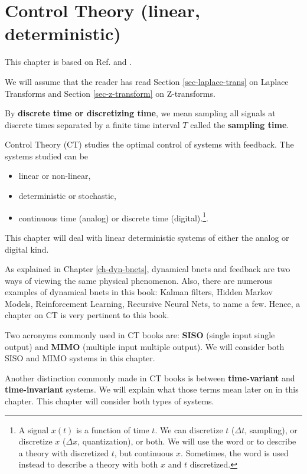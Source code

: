 \chapter{Control Theory (linear, deterministic)}
\label{ch-control-th}

This chapter is
based on Ref.\cite{wikibooks-control-systems}
and \cite{wiki-signal-flow}.

We will assume that
the reader has read Section \ref{sec-laplace-trans}
on Laplace Transforms
and Section \ref{sec-z-transform}
on Z-transforms.

By {\bf discrete time or discretizing time}, we mean 
 sampling all signals
 at discrete times
 separated by a finite time
 interval $T$
 called the {\bf sampling time}.

Control Theory (CT)
studies the optimal
control of systems
with feedback. 
The systems studied can
be 
\begin{itemize}
\item linear or non-linear,
\item deterministic or stochastic,
\item continuous time (analog)
or
discrete time (digital).\footnote{A signal $x(t)$ is a function of time $t$.
We can discretize $t$ ($\Delta t$, sampling), or discretize 
$x$ ($\Delta x$, quantization),
or both. We will use the word
 or  to
describe a theory with discretized $t$,
but continuous $x$. 
Sometimes,
the word 
is used instead to describe
a theory with both $x$ and $t$ discretized.}.
\end{itemize}
This chapter will deal
with linear deterministic
systems of either 
the analog or digital kind.

As explained in Chapter
\ref{ch-dyn-bnets},
dynamical bnets and feedback
are two ways
of viewing the same 
physical phenomenon.
Also, there are numerous examples
of dynamical bnets in this book:
Kalman filters, Hidden Markov Models,
Reinforcement Learning,
Recursive Neural Nets, to name a few.
Hence, a chapter 
on CT is very 
pertinent to this book.

Two acronyms
commonly 
used in CT books
are:
{\bf SISO} (single input single output)
and
{\bf MIMO} (multiple input multiple output). We will consider both
SISO and MIMO systems in this chapter.

Another distinction
commonly
made in CT books
is between {\bf time-variant}
and {\bf time-invariant } systems.
We will explain what those terms
mean later on in this chapter.
This chapter will consider
both types of systems.



